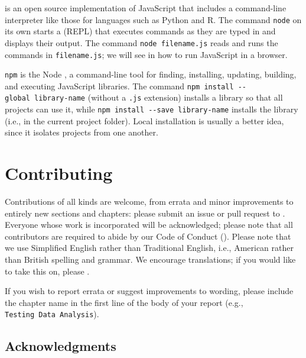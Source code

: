  is an open source implementation of JavaScript
that includes a command-line interpreter like those for languages such as Python and R.
The command \texttt{node} on its own starts a  (REPL)
that executes commands as they are typed in and displays their output.
The command \texttt{node\ filename.js} reads and runs the commands in \texttt{filename.js};
we will see in  how to run JavaScript in a browser.

\texttt{npm}
is the Node ,
a command-line tool for finding, installing, updating, building, and executing JavaScript libraries.
The command \texttt{npm\ install\ -\/-global\ library-name} (without a \texttt{.js} extension)
installs a library 
so that all projects can use it,
while \texttt{npm\ install\ -\/-save\ library-name} installs the library
(i.e., in the current project folder).
Local installation is usually a better idea,
since it isolates projects from one another.

\section{Contributing}\label{s:index-contrib}

Contributions of all kinds are welcome, from errata and minor improvements to
entirely new sections and chapters: please submit an issue or pull
request to . Everyone whose work is incorporated will be acknowledged;
please note that all contributors are required to abide by our Code of Conduct
().  Please note that we use Simplified English rather than
Traditional English, i.e., American rather than British spelling and grammar. We
encourage translations; if you would like to take this on, please
.

If you wish to report errata or suggest improvements to wording, please include
the chapter name in the first line of the body of your report (e.g., \texttt{Testing\ Data\ Analysis}).

\subsection{Acknowledgments}\label{s:intro-acknowledgments}

